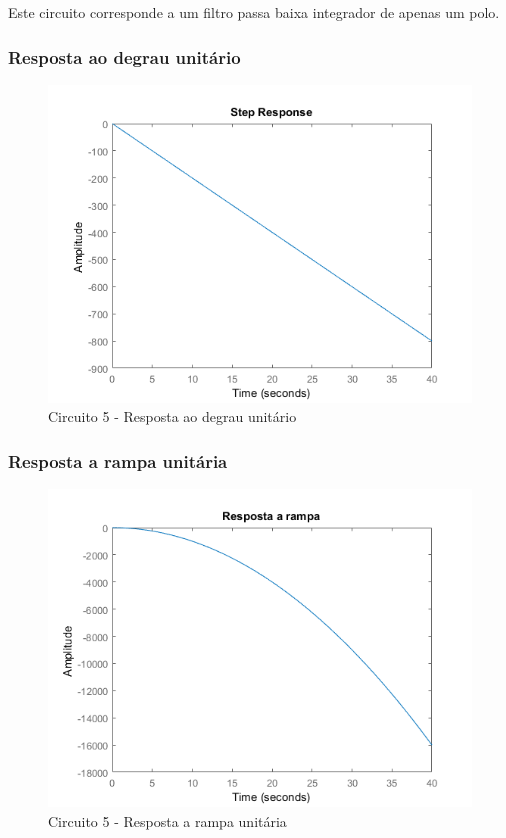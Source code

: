\documentclass[a4paper, 12pt]{article}
\begin{document}
			Este circuito corresponde a um filtro passa baixa integrador de apenas um polo.

			\subsubsection{Resposta ao degrau unitário}
			\begin{figure}[!ht]
				\centering
				\includegraphics[scale=0.68]{img/1g_circ5.png}
				\caption{Circuito 5 - Resposta ao degrau unitário}
			\end{figure}
			\subsubsection{Resposta a rampa unitária}
			\begin{figure}[!ht]
				\centering
				\includegraphics[scale=0.68]{img/1h_circ5.png}
				\caption{Circuito 5 - Resposta a rampa unitária}
			\end{figure}
\end{document}
